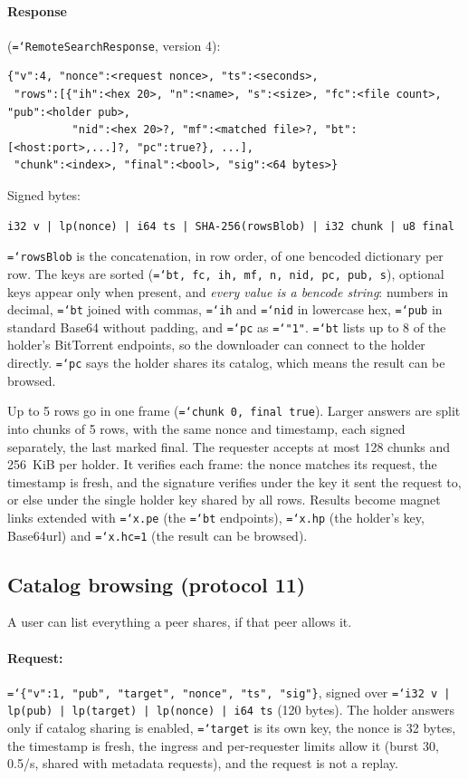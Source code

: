 \documentclass[11pt,a4paper]{article}
\newcommand{\code}[1]{\texttt{\hyphenchar\font=`\-\relax #1}}
\DeclareRobustCommand{\_}{\origunderscore\allowbreak}
\begin{document}
\paragraph{Response} (\code{RemoteSearchResponse}, version 4):
\begin{lstlisting}
{"v":4, "nonce":<request nonce>, "ts":<seconds>,
 "rows":[{"ih":<hex 20>, "n":<name>, "s":<size>, "fc":<file count>, "pub":<holder pub>,
          "nid":<hex 20>?, "mf":<matched file>?, "bt":[<host:port>,...]?, "pc":true?}, ...],
 "chunk":<index>, "final":<bool>, "sig":<64 bytes>}
\end{lstlisting}
Signed bytes:
\begin{lstlisting}
i32 v | lp(nonce) | i64 ts | SHA-256(rowsBlob) | i32 chunk | u8 final
\end{lstlisting}
\code{rowsBlob} is the concatenation, in row order, of one bencoded dictionary per row. The
keys are sorted (\code{bt, fc, ih, mf, n, nid, pc, pub, s}), optional keys appear only when
present, and \emph{every value is a bencode string}: numbers in decimal, \code{bt} joined
with commas, \code{ih} and \code{nid} in lowercase hex, \code{pub} in standard Base64
without padding, and \code{pc} as \code{"1"}. \code{bt} lists up to 8 of the holder's
BitTorrent endpoints, so the downloader can connect to the holder directly. \code{pc} says
the holder shares its catalog, which means the result can be browsed.

Up to 5 rows go in one frame (\code{chunk 0, final true}). Larger answers are split into
chunks of 5 rows, with the same nonce and timestamp, each signed separately, the last marked
final. The requester accepts at most 128 chunks and 256~KiB per holder. It verifies each
frame: the nonce matches its request, the timestamp is fresh, and the signature verifies under
the key it sent the request to, or else under the single holder key shared by all rows.
Results become magnet links extended with \code{x.pe} (the \code{bt} endpoints),
\code{x.hp} (the holder's key, Base64url) and \code{x.hc=1} (the result can be browsed).

\subsection{Catalog browsing (protocol 11)}
\label{sec:catalog}
A user can list everything a peer shares, if that peer allows it.
\paragraph{Request:} \code{\{"v":1, "pub", "target", "nonce", "ts", "sig"\}}, signed over
\code{i32 v | lp(pub) | lp(target) | lp(nonce) | i64 ts} (120 bytes). The holder answers only
if catalog sharing is enabled, \code{target} is its own key, the nonce is 32 bytes, the
timestamp is fresh, the ingress and per-requester limits allow it (burst 30, 0.5/s, shared
with metadata requests), and the request is not a replay.
\end{document}
